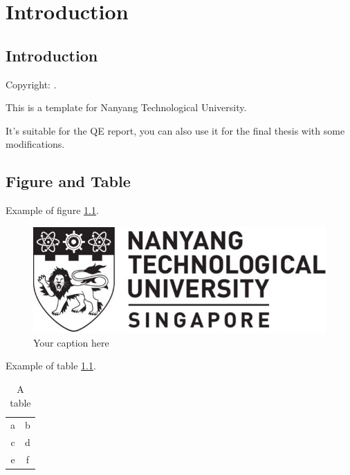 \chapter{Introduction} 

\section{Introduction}
Copyright: \cite{CR_2023}.

This is a template for Nanyang Technological University.

It's suitable for the QE report, you can also use it for the final thesis with some modifications.

\section{Figure and Table}

Example of figure \ref{fig:my_label}.

\blindtext
\begin{figure}
    \centering
    \includegraphics[width = .8\textwidth]{pre_figure/ntu_logo_bw.jpg}
    \caption{Your caption here}
    \label{fig:my_label}
\end{figure}

Example of table \ref{tab:my_label}.

\blindtext
\begin{table}[h]
    \centering
    \caption{A table}
    \begin{tabular}{cc}
      \hline
      a   & b \\
      c   & d \\ \hline
      e   & f \\ \hline
    \end{tabular}    
    \label{tab:my_label}
\end{table}


\clearpage